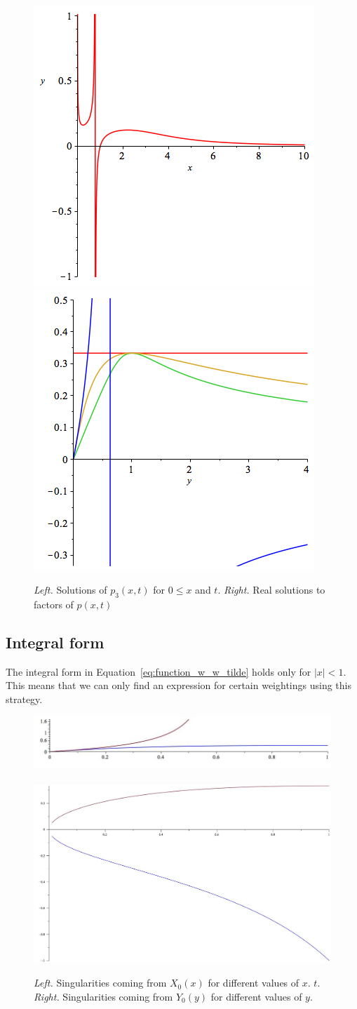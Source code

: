 \documentclass[11pt]{article}
\renewcommand{\leq}{\leqslant}
\begin{document}
\begin{figure}\center
\includegraphics[width=.45\textwidth]{TDomSing.png}
\includegraphics[width=.45\textwidth]{TDomSing2.png}
\caption{{\it Left. } Solutions of $p_3(x,t)$ for $0\leq x$ and
  $t$. {\it Right. }Real solutions to factors of $p(x,t)$}
\label{fig:TDomSing}
\end{figure}


\subsection{Integral form}
The integral form in Equation~\eqref{eq:function_w_w_tilde} holds only
for $|x|<1$. This means that we can only find an expression for
certain weightings using this strategy.
\begin{figure}\center
\includegraphics[width=.45\textwidth]{X0-roots.jpg} $\qquad$
\includegraphics[width=.45\textwidth]{Y0-roots.jpg}
\caption{{\it Left. } Singularities coming from $X_0(x)$ for different
  values of $x$. 
  $t$. {\it Right. }Singularities coming from $Y_0(y)$ for different
  values of $y$. }
\label{fig:TDomSing}
\end{figure}
\end{document}
